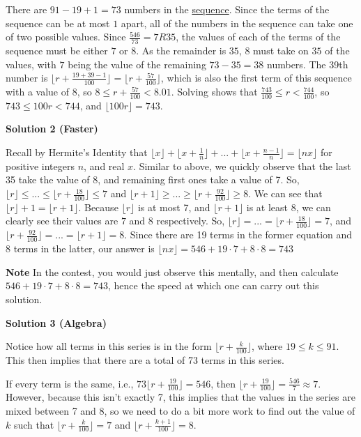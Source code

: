 \begin{enumerate}
There are $91 - 19 + 1 = 73$ numbers in the \href{https://artofproblemsolving.com/wiki/index.php?title=Sequence}{sequence}. Since the terms of the sequence can be at most $1$ apart, all of the numbers in the sequence can take one of two possible values. Since $\frac{546}{73} = 7 R 35$, the values of each of the terms of the sequence must be either $7$ or $8$. As the remainder is $35$, $8$ must take on $35$ of the values, with $7$ being the value of the remaining $73 - 35 = 38$ numbers. The 39th number is $\lfloor r+\frac{19 + 39 - 1}{100}\rfloor= \lfloor r+\frac{57}{100}\rfloor$, which is also the first term of this sequence with a value of $8$, so $8 \le r + \frac{57}{100} < 8.01$. Solving shows that $\frac{743}{100} \le r < \frac{744}{100}$, so $743\le 100r < 744$, and $\lfloor 100r \rfloor = \boxed{743}$.

 



\textbf{Solution 2 (Faster)}

Recall by Hermite's Identity that $\lfloor x\rfloor +\lfloor x+\frac{1}{n}\rfloor +...+\lfloor x+\frac{n-1}{n}\rfloor = \lfloor nx\rfloor$ for positive integers $n$, and real $x$. Similar to above, we quickly observe that the last 35 take the value of 8, and remaining first ones take a value of 7. So, $\lfloor r\rfloor \le ...\le \lfloor r+\frac{18}{100}\rfloor \le 7$ and $\lfloor r+1\rfloor \ge ...\ge \lfloor r+\frac{92}{100}\rfloor \ge 8$. We can see that $\lfloor r\rfloor +1=\lfloor r+1\rfloor$. Because $\lfloor r\rfloor$ is at most 7, and $\lfloor r+1\rfloor$ is at least 8, we can clearly see their values are $7$ and $8$ respectively. So,  $\lfloor r\rfloor = ... = \lfloor r+\frac{18}{100}\rfloor = 7$, and $\lfloor r+\frac{92}{100}\rfloor = ...= \lfloor r+1\rfloor = 8$. Since there are 19 terms in the former equation and 8 terms in the latter, our answer is $\lfloor nx\rfloor = 546+19\cdot 7+8\cdot 8=\boxed{743}$

 \textbf{Note} In the contest, you would just observe this mentally, and then calculate $546+19\cdot 7+8\cdot 8= 743$, hence the speed at which one can carry out this solution.

 



\textbf{Solution 3 (Algebra)}

Notice how all terms in this series is in the form \( \lfloor r + \frac{k}{100} \rfloor \), where \( 19 \le k \le 91 \). This then implies that there are a total of 73 terms in this series.

 If every term is the same, i.e., \( 73 \lfloor r + \frac{19}{100} \rfloor = 546 \), then \( \lfloor r + \frac{19}{100} \rfloor = \frac{546}{7} \approx 7 \). However, because this isn't exactly 7, this implies that the values in the series are mixed between 7 and 8, so we need to do a bit more work to find out the value of \( k \) such that \( \lfloor r + \frac{k}{100} \rfloor = 7 \) and \( \lfloor r + \frac{k+1}{100} \rfloor = 8 \).


\end{enumerate}
